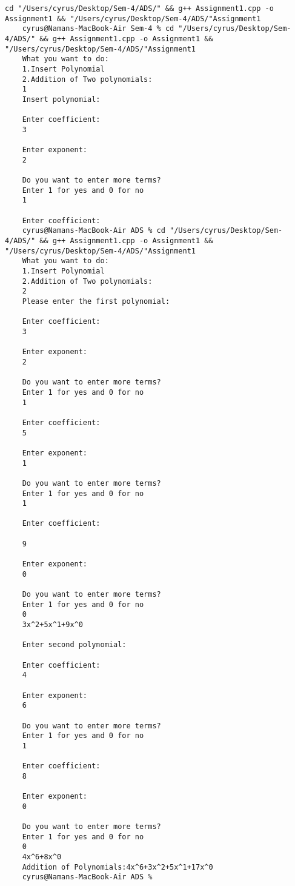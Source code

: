 \documentclass{article}
\begin{document}
\begin{lstlisting}[caption = Output]
    cd "/Users/cyrus/Desktop/Sem-4/ADS/" && g++ Assignment1.cpp -o Assignment1 && "/Users/cyrus/Desktop/Sem-4/ADS/"Assignment1
    cyrus@Namans-MacBook-Air Sem-4 % cd "/Users/cyrus/Desktop/Sem-4/ADS/" && g++ Assignment1.cpp -o Assignment1 && "/Users/cyrus/Desktop/Sem-4/ADS/"Assignment1
    What you want to do:
    1.Insert Polynomial
    2.Addition of Two polynomials:
    1
    Insert polynomial:
    
    Enter coefficient:
    3       
    
    Enter exponent:
    2
    
    Do you want to enter more terms?
    Enter 1 for yes and 0 for no
    1
    
    Enter coefficient:
    cyrus@Namans-MacBook-Air ADS % cd "/Users/cyrus/Desktop/Sem-4/ADS/" && g++ Assignment1.cpp -o Assignment1 && "/Users/cyrus/Desktop/Sem-4/ADS/"Assignment1
    What you want to do:
    1.Insert Polynomial
    2.Addition of Two polynomials:
    2
    Please enter the first polynomial:
    
    Enter coefficient:
    3
    
    Enter exponent:
    2
    
    Do you want to enter more terms?
    Enter 1 for yes and 0 for no
    1
    
    Enter coefficient:
    5
    
    Enter exponent:
    1
    
    Do you want to enter more terms?
    Enter 1 for yes and 0 for no
    1
    
    Enter coefficient:
    
    9
    
    Enter exponent:
    0
    
    Do you want to enter more terms?
    Enter 1 for yes and 0 for no
    0
    3x^2+5x^1+9x^0
    
    Enter second polynomial:
    
    Enter coefficient:
    4
    
    Enter exponent:
    6
    
    Do you want to enter more terms?
    Enter 1 for yes and 0 for no
    1
    
    Enter coefficient:
    8
    
    Enter exponent:
    0
    
    Do you want to enter more terms?
    Enter 1 for yes and 0 for no
    0
    4x^6+8x^0
    Addition of Polynomials:4x^6+3x^2+5x^1+17x^0
    cyrus@Namans-MacBook-Air ADS % 
\end{lstlisting}
\end{document}
